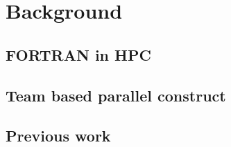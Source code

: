 \chapter{Background}\label{chap:Background}
\section{FORTRAN in HPC}
\section{Team based parallel construct}
\section{Previous work}